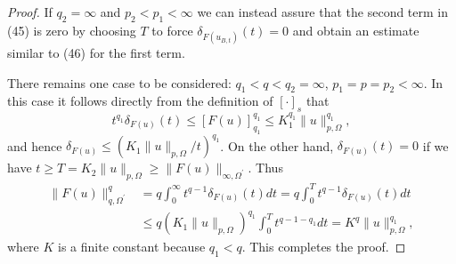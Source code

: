 \begin{proof}
  If $q_2=\infty$ and $p_2<p_1<\infty$ we can instead assure that the second term in (45)
  is zero by choosing $T$ to force $\delta_{F\left(u_{B, t}\right)}(t)=0$ and obtain an estimate similar 
  to (46) for the first term.
  
  There remains one case to be considered: $q_1<q<q_2=\infty$, $p_1=p=p_2<\infty$.
  In this case it follows directly from the definition of $[\cdot]_s$ that
  \[
  t^{q_1} \delta_{F(u)}(t) \leq[F(u)]_{q_1}^{q_1} \leq K_1^{q_1}\|u\|_{p, \Omega}^{q_1},
  \]
  and hence $\delta_{F(u)} \leq\left(K_1\|u\|_{p, \Omega} / t\right)^{q_1}$.
  On the other hand, $\delta_{F(u)}(t)=0$ if we have
  $t \geq T=K_2\|u\|_{p, \Omega} \geq\|F(u)\|_{\infty, \Omega^{\prime}}$. Thus
  \[
  \begin{aligned}
  \|F(u)\|_{q, \Omega^{\prime}}^q & =q \int_0^{\infty} t^{q-1} \delta_{F(u)}(t) d t=q \int_0^T t^{q-1} \delta_{F(u)}(t) d t \\
  & \leq q\left(K_1\|u\|_{p, \Omega}\right)^{q_1} \int_0^T t^{q-1-q_1} d t=K^q\|u\|_{p, \Omega}^{q_1},
  \end{aligned}
  \]
  where $K$ is a finite constant because $q_1<q$. This completes the proof.
\end{proof}